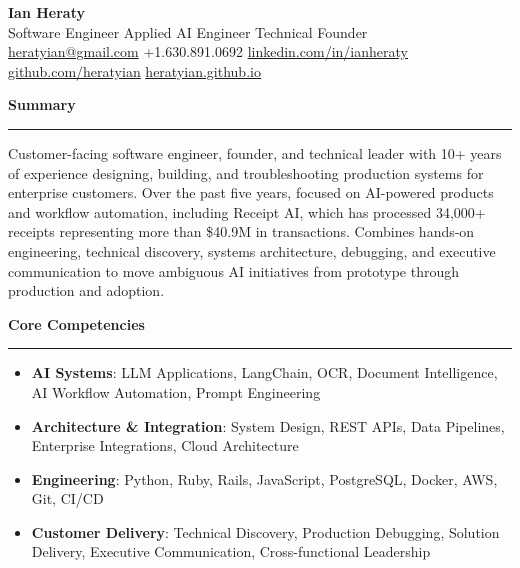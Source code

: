 \documentclass[letterpaper,9pt]{extarticle}
\newcommand{\resheading}[1]{
  \vspace{15pt}
  \textbf{\large #1}
  \vspace{5pt}
  \hrule
  \vspace{10pt}
}
\begin{document}
\begin{center}

{\LARGE\textbf{Ian Heraty}}\\[3pt]

{\large
Software Engineer
\quad\textbullet\quad
Applied AI Engineer
\quad\textbullet\quad
Technical Founder
}\\[5pt]

\href{mailto:heratyian@gmail.com}{heratyian@gmail.com}
\quad\textbullet\quad
+1.630.891.0692
\quad\textbullet\quad
\href{https://www.linkedin.com/in/ianheraty/}{linkedin.com/in/ianheraty}
\\[3pt]
\href{https://github.com/heratyian}{github.com/heratyian}
\quad\textbullet\quad
\href{https://heratyian.github.io}{heratyian.github.io}

\end{center}

\resheading{Summary}

Customer-facing software engineer, founder, and technical leader with 10+ years of experience designing, building, and troubleshooting production systems for enterprise customers. Over the past five years, focused on AI-powered products and workflow automation, including Receipt AI, which has processed 34,000+ receipts representing more than \$40.9M in transactions. Combines hands-on engineering, technical discovery, systems architecture, debugging, and executive communication to move ambiguous AI initiatives from prototype through production and adoption.

\resheading{Core Competencies}

\begin{itemize}
\item \textbf{AI Systems}: LLM Applications, LangChain, OCR, Document Intelligence, AI Workflow Automation, Prompt Engineering
\item \textbf{Architecture \& Integration}: System Design, REST APIs, Data Pipelines, Enterprise Integrations, Cloud Architecture
\item \textbf{Engineering}: Python, Ruby, Rails, JavaScript, PostgreSQL, Docker, AWS, Git, CI/CD
\item \textbf{Customer Delivery}: Technical Discovery, Production Debugging, Solution Delivery, Executive Communication, Cross-functional Leadership
\end{itemize}
\end{document}
